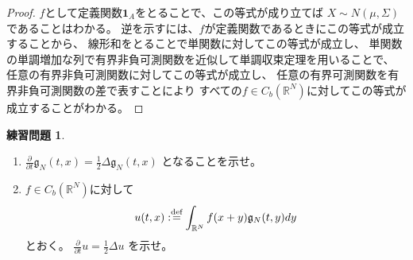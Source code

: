 \documentclass[uplatex]{jsarticle}
\theoremstyle{definition}
\newtheorem{prob}[prob]{練習問題}
\def\R{\mathbb{R}}
\def\I{\mathbf{1}}
\def\dfn{:\overset{\mbox{{\scriptsize def}}}{=}}
\begin{document}
\begin{proof}
  \(f\)として定義関数\(\I_A\)をとることで、この等式が成り立てば
  \(X\sim N(\mu,\Sigma)\)であることはわかる。
  逆を示すには、\(f\)が定義関数であるときにこの等式が成立することから、
  線形和をとることで単関数に対してこの等式が成立し、
  単関数の単調増加な列で有界非負可測関数を近似して単調収束定理を用いることで、
  任意の有界非負可測関数に対してこの等式が成立し、
  任意の有界可測関数を有界非負可測関数の差で表すことにより
  すべての\(f\in C_b(\R^N)\)に対してこの等式が成立することがわかる。
\end{proof}














\begin{prob}\label{prob: 3.2}
  \
  \begin{enumerate}
    \item \label{enumi: prob: 3.2-1}
    \(\frac{\partial}{\partial t}\mathfrak{g}_N(t,x)
    = \frac{1}{2}\Delta\mathfrak{g}_N(t,x)\)
    となることを示せ。
    \item \label{enumi: prob: 3.2-2}
    \(f\in C_b(\R^N)\)に対して
    \[
    u(t,x) \dfn \int_{\R^N}f(x+y)\mathfrak{g}_N(t,y)dy
    \]
    とおく。
    \(\frac{\partial}{\partial t}u = \frac{1}{2}\Delta u\)
    を示せ。
  \end{enumerate}
\end{prob}
\end{document}
